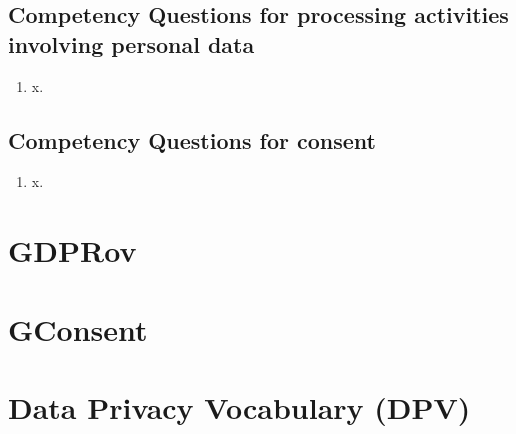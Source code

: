 \subsection{Competency Questions for processing activities involving personal data}
\begin{enumerate}[label={\textit{CQ.\theenumi}},resume]
    \item x.
\end{enumerate}

\subsection{Competency Questions for consent}
\begin{enumerate}[label={\textit{CQ.\theenumi}},resume]
    \item x.
\end{enumerate}

\section{GDPRov}\label{sec:voc:GDPRov}

\section{GConsent}\label{sec:voc:GConsent}

\section{Data Privacy Vocabulary (DPV)}\label{sec:voc:DPV}